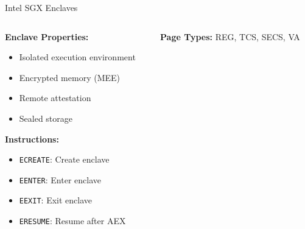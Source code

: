 \documentclass[aspectratio=169,12pt]{beamer}
\begin{document}
\begin{frame}{Intel SGX Enclaves}
    \begin{columns}
        \begin{column}{0.5\textwidth}
            \textbf{Enclave Properties:}
            \begin{itemize}
                \item Isolated execution environment
                \item Encrypted memory (MEE)
                \item Remote attestation
                \item Sealed storage
            \end{itemize}
            
            \vspace{0.3cm}
            \textbf{Instructions:}
            \begin{itemize}
                \item \texttt{ECREATE}: Create enclave
                \item \texttt{EENTER}: Enter enclave
                \item \texttt{EEXIT}: Exit enclave
                \item \texttt{ERESUME}: Resume after AEX
            \end{itemize}
        \end{column}
        \begin{column}{0.5\textwidth}
            
            \vspace{0.3cm}
            \textbf{Page Types:}
            REG, TCS, SECS, VA
        \end{column}
    \end{columns}
\end{frame}
\end{document}
